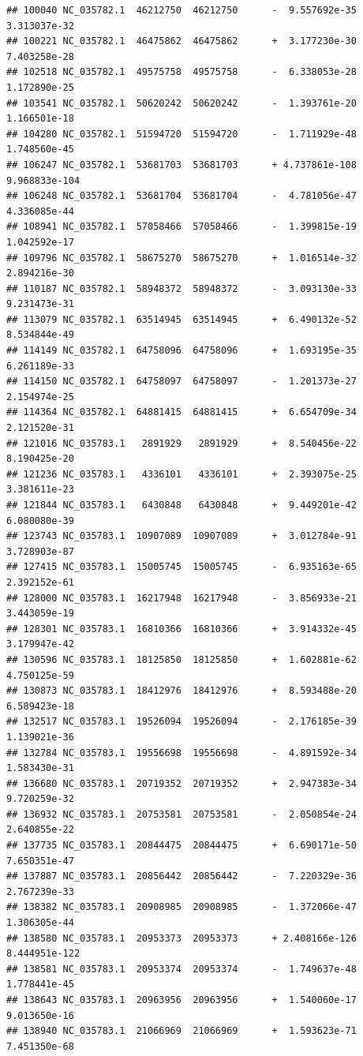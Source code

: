\documentclass[]{article}
\begin{document}
\begin{verbatim}
## 100040 NC_035782.1  46212750  46212750      -  9.557692e-35  3.313037e-32
## 100221 NC_035782.1  46475862  46475862      +  3.177230e-30  7.403258e-28
## 102518 NC_035782.1  49575758  49575758      -  6.338053e-28  1.172890e-25
## 103541 NC_035782.1  50620242  50620242      -  1.393761e-20  1.166501e-18
## 104280 NC_035782.1  51594720  51594720      -  1.711929e-48  1.748560e-45
## 106247 NC_035782.1  53681703  53681703      + 4.737861e-108 9.968833e-104
## 106248 NC_035782.1  53681704  53681704      -  4.781056e-47  4.336085e-44
## 108941 NC_035782.1  57058466  57058466      -  1.399815e-19  1.042592e-17
## 109796 NC_035782.1  58675270  58675270      +  1.016514e-32  2.894216e-30
## 110187 NC_035782.1  58948372  58948372      -  3.093130e-33  9.231473e-31
## 113079 NC_035782.1  63514945  63514945      +  6.490132e-52  8.534844e-49
## 114149 NC_035782.1  64758096  64758096      +  1.693195e-35  6.261189e-33
## 114150 NC_035782.1  64758097  64758097      -  1.201373e-27  2.154974e-25
## 114364 NC_035782.1  64881415  64881415      +  6.654709e-34  2.121520e-31
## 121016 NC_035783.1   2891929   2891929      +  8.540456e-22  8.190425e-20
## 121236 NC_035783.1   4336101   4336101      +  2.393075e-25  3.381611e-23
## 121844 NC_035783.1   6430848   6430848      +  9.449201e-42  6.080080e-39
## 123743 NC_035783.1  10907089  10907089      +  3.012784e-91  3.728903e-87
## 127415 NC_035783.1  15005745  15005745      -  6.935163e-65  2.392152e-61
## 128000 NC_035783.1  16217948  16217948      -  3.856933e-21  3.443059e-19
## 128301 NC_035783.1  16810366  16810366      +  3.914332e-45  3.179947e-42
## 130596 NC_035783.1  18125850  18125850      +  1.602881e-62  4.750125e-59
## 130873 NC_035783.1  18412976  18412976      +  8.593488e-20  6.589423e-18
## 132517 NC_035783.1  19526094  19526094      -  2.176185e-39  1.139021e-36
## 132784 NC_035783.1  19556698  19556698      -  4.891592e-34  1.583430e-31
## 136680 NC_035783.1  20719352  20719352      +  2.947383e-34  9.720259e-32
## 136932 NC_035783.1  20753581  20753581      -  2.050854e-24  2.640855e-22
## 137735 NC_035783.1  20844475  20844475      +  6.690171e-50  7.650351e-47
## 137887 NC_035783.1  20856442  20856442      -  7.220329e-36  2.767239e-33
## 138382 NC_035783.1  20908985  20908985      -  1.372066e-47  1.306305e-44
## 138580 NC_035783.1  20953373  20953373      + 2.408166e-126 8.444951e-122
## 138581 NC_035783.1  20953374  20953374      -  1.749637e-48  1.778441e-45
## 138643 NC_035783.1  20963956  20963956      +  1.540060e-17  9.013650e-16
## 138940 NC_035783.1  21066969  21066969      +  1.593623e-71  7.451350e-68

\end{verbatim}
\end{document}
